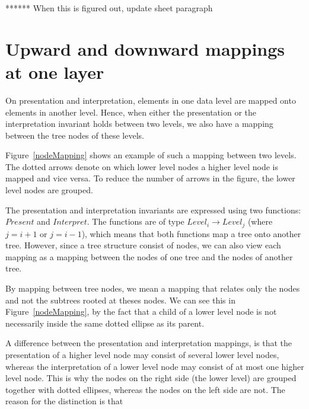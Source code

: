 ****** When this is figured out, update sheet paragraph
\ec


%																
\section{Upward and downward mappings at one layer}\label{mappingsInLayer}


On presentation and interpretation, elements in one data level are mapped onto elements in another level. Hence, when either the presentation or the interpretation invariant holds between two levels, we also have a mapping between the tree nodes of these levels. 

Figure~\ref{nodeMapping} shows an example of such a mapping between two levels. The dotted arrows denote on which lower level nodes a higher level node is mapped and vice versa. To reduce the number of arrows in the figure, the lower level nodes are grouped.

\bc The presentation and interpretation invariants are expressed using two functions: $Present$ and $Interpret$. The functions are of type $Level_i \rightarrow Level_j$ (where $j = i+1$ or
$j = i-1$), which means that both functions map a tree onto another tree. However, since a tree structure consist of nodes, we can also view each mapping as a mapping between the nodes of one tree and the nodes of another tree.  
\ec

By mapping between tree nodes, we mean a mapping that relates only the nodes and not the subtrees rooted at theses nodes. We can see this in Figure~\ref{nodeMapping}, by the fact that a child of a lower level node is not necessarily inside the same dotted ellipse as its parent. 


A difference between the presentation and interpretation mappings, is that the presentation of a higher level node may consist of several lower level nodes, whereas the interpretation of a lower level node may consist of at most one higher level node. This is why the nodes on the right side (the lower level) are grouped together with dotted ellipses, whereas the nodes on the left side are not. The reason for the distinction is that 
\toHere     %

